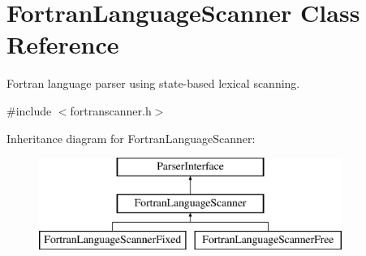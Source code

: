 \hypertarget{class_fortran_language_scanner}{}\section{Fortran\+Language\+Scanner Class Reference}
\label{class_fortran_language_scanner}


Fortran language parser using state-\/based lexical scanning.  




{\ttfamily \#include $<$fortranscanner.\+h$>$}

Inheritance diagram for Fortran\+Language\+Scanner\+:\begin{figure}[H]
\begin{center}
\leavevmode
\includegraphics[height=3.000000cm]{class_fortran_language_scanner}
\end{center}
\end{figure}
